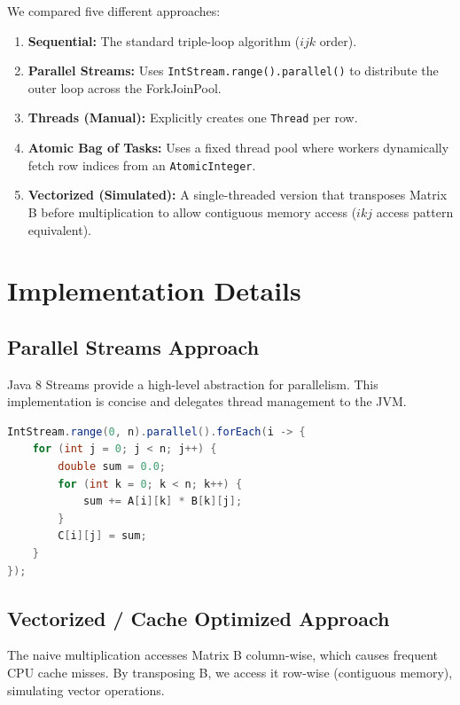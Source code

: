 \documentclass[a4paper,12pt]{article}
\begin{document}
We compared five different approaches:

\begin{enumerate}
    \item \textbf{Sequential:} The standard triple-loop algorithm ($ijk$ order).
    \item \textbf{Parallel Streams:} Uses \texttt{IntStream.range().parallel()} to distribute the outer loop across the ForkJoinPool.
    \item \textbf{Threads (Manual):} Explicitly creates one \texttt{Thread} per row.
    \item \textbf{Atomic Bag of Tasks:} Uses a fixed thread pool where workers dynamically fetch row indices from an \texttt{AtomicInteger}.
    \item \textbf{Vectorized (Simulated):} A single-threaded version that transposes Matrix B before multiplication to allow contiguous memory access ($ikj$ access pattern equivalent).
\end{enumerate}

\section{Implementation Details}

\subsection{Parallel Streams Approach}
Java 8 Streams provide a high-level abstraction for parallelism. This implementation is concise and delegates thread management to the JVM.

\begin{lstlisting}[language=Java, caption={Parallel Stream Implementation}]
IntStream.range(0, n).parallel().forEach(i -> {
    for (int j = 0; j < n; j++) {
        double sum = 0.0;
        for (int k = 0; k < n; k++) {
            sum += A[i][k] * B[k][j];
        }
        C[i][j] = sum;
    }
});
\end{lstlisting}

\subsection{Vectorized / Cache Optimized Approach}
The naive multiplication accesses Matrix B column-wise, which causes frequent CPU cache misses. By transposing B, we access it row-wise (contiguous memory), simulating vector operations.
\end{document}
